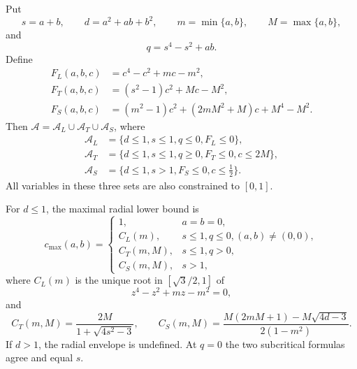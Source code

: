 \begin{proposition}
\label{prop:exact-admissible-set}
\label{prop:local-admissible}
Put
\[
 s=a+b,\qquad d=a^2+ab+b^2,\qquad
 m=\min\{a,b\},\qquad M=\max\{a,b\},
\]
and
\[
 q=s^4-s^2+ab.
\]
Define
\begin{align*}
 F_L(a,b,c)&=c^4-c^2+mc-m^2,\\
 F_T(a,b,c)&=(s^2-1)c^2+Mc-M^2,\\
 F_S(a,b,c)&=(m^2-1)c^2+(2mM^2+M)c+M^4-M^2.
\end{align*}
Then $\mathcal A=\mathcal A_L\cup\mathcal A_T\cup\mathcal A_S$, where
\begin{align*}
 \mathcal A_L&=\{d\le1, s\le1, q\le0, F_L\le0\},\\
 \mathcal A_T&=\{d\le1, s\le1, q\ge0, F_T\le0, c\le2M\},\\
 \mathcal A_S&=\{d\le1, s>1, F_S\le0, c\le\tfrac12\}.
\end{align*}
All variables in these three sets are also constrained to $[0,1]$.

For $d\le1$, the maximal radial lower bound is
\begin{equation}
 c_{\max}(a,b)=
 \begin{cases}
  1,&a=b=0,\\
  C_L(m),&s\le1, q\le0, (a,b)\ne(0,0),\\
  C_T(m,M),&s\le1, q>0,\\
  C_S(m,M),&s>1,
 \end{cases}
 \label{eq:radial-envelope}
\end{equation}
where $C_L(m)$ is the unique root in $[\sqrt3/2,1]$ of
\[
 z^4-z^2+mz-m^2=0,
\]
and
\[
 C_T(m,M)=\frac{2M}{1+\sqrt{4s^2-3}},
\qquad
 C_S(m,M)=
 \frac{M(2mM+1)-M\sqrt{4d-3}}{2(1-m^2)}.
\]
If $d>1$, the radial envelope is undefined.  At $q=0$ the two subcritical
formulas agree and equal $s$.
\end{proposition}


